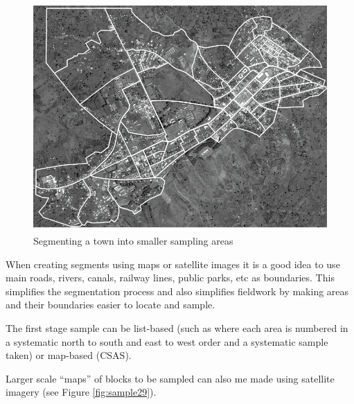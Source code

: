 \documentclass[12pt,a4paper]{book}
\theoremstyle{definition}
\theoremstyle{definition}
\theoremstyle{definition}
\theoremstyle{remark}
\begin{document}
\begin{figure}[H]

{\centering \includegraphics{figures/stage2sample14} 

}

\caption{Segmenting a town into smaller sampling areas}\label{fig:sample28}
\end{figure}

When creating segments using maps or satellite images it is a good idea
to use main roads, rivers, canals, railway lines, public parks, etc as
boundaries. This simplifies the segmentation process and also simplifies
fieldwork by making areas and their boundaries easier to locate and
sample.

The first stage sample can be list-based (such as where each area is
numbered in a systematic north to south and east to west order and a
systematic sample taken) or map-based (CSAS).

Larger scale ``maps'' of blocks to be sampled can also me made using
satellite imagery (see Figure \ref{fig:sample29}).
\end{document}
